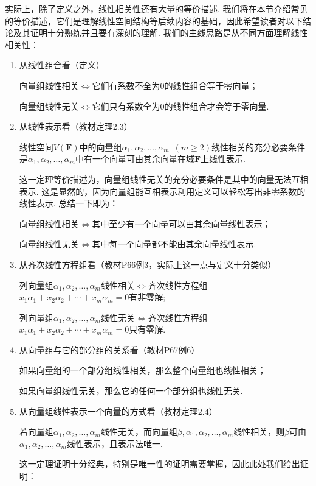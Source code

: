 实际上，除了定义之外，线性相关性还有大量的等价描述. 我们将在本节介绍常见的等价描述，它们是理解线性空间结构等后续内容的基础，因此希望读者对以下结论及其证明十分熟练并且要有深刻的理解. 我们的主线思路是从不同方面理解线性相关性：
\begin{enumerate}
    \item 从线性组合看（定义）

          向量组线性相关$\iff$它们有系数不全为0的线性组合等于零向量；

          向量组线性无关$\iff$它们只有系数全为0的线性组合才会等于零向量.

    \item 从线性表示看（教材定理2.3）
          \begin{theorem}
              线性空间$V(\mathbf{F})$中的向量组$\alpha_1,\alpha_2,\ldots,\alpha_m\enspace(m \geqslant 2)$线性相关的充分必要条件是$\alpha_1,\alpha_2,\ldots,\alpha_m$中有一个向量可由其余向量在域$\mathbf{F}$上线性表示.
          \end{theorem}
          这一定理等价描述为，向量组线性无关的充分必要条件是其中的向量无法互相表示. 这是显然的，因为向量组能互相表示利用定义可以轻松写出非零系数的线性表示. 总结一下即为：

          向量组线性相关$\iff$其中至少有一个向量可以由其余向量线性表示；

          向量组线性无关$\iff$其中每一个向量都不能由其余向量线性表示.

    \item 从齐次线性方程组看（教材P66例3，实际上这一点与定义十分类似）

          列向量组$\alpha_1,\alpha_2,\ldots,\alpha_m$线性相关$\iff$齐次线性方程组$x_1\alpha_1+x_2\alpha_2+\cdots+x_m\alpha_m=0$有非零解;

          列向量组$\alpha_1,\alpha_2,\ldots,\alpha_m$线性无关$\iff$齐次线性方程组$x_1\alpha_1+x_2\alpha_2+\cdots+x_m\alpha_m=0$只有零解.

    \item 从向量组与它的部分组的关系看（教材P67例6）

          如果向量组的一个部分组线性相关，那么整个向量组也线性相关；

          如果向量组线性无关，那么它的任何一个部分组也线性无关.

    \item 从向量组线性表示一个向量的方式看（教材定理2.4）
          \begin{theorem}\label{thm:3:线性无关等价表示唯一}
              若向量组$\alpha_1,\alpha_2,\ldots,\alpha_m$线性无关，而向量组$\beta,\alpha_1,\alpha_2,\ldots,\alpha_m$线性相关，则$\beta$可由$\alpha_1,\alpha_2,\ldots,\alpha_m$线性表示，且表示法唯一.
          \end{theorem}
          这一定理证明十分经典，特别是唯一性的证明需要掌握，因此此处我们给出证明：


\end{enumerate}
